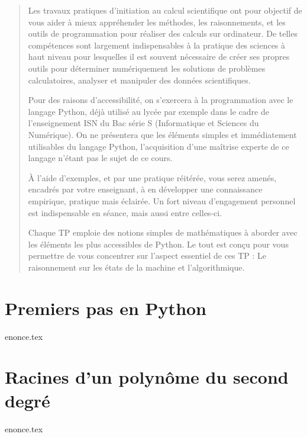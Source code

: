 \documentclass[a4paper,11pt,titlepage]{article}
\begin{document}
\begin{abstract}
  Les travaux  pratiques d'initiation au calcul  scientifique ont pour
  objectif  de  vous  aider  à mieux  appréhender  les  méthodes,  les
  raisonnements,  et les  outils  de programmation  pour réaliser  des
  calculs  sur  ordinateur.   De  telles  compétences  sont  largement
  indispensables  à  la pratique  des  sciences  à haut  niveau pour
  lesquelles il est souvent nécessaire de créer ses propres outils pour
  déterminer  numériquement  les solutions de problèmes calculatoires,
  analyser et manipuler des données scientifiques.

  Pour des  raisons d'accessibilité, on s'exercera  à la programmation
  avec le  langage Python, déjà utilisé  au lycée par exemple  dans le
  cadre de l'enseignement ISN du Bac série S (Informatique et Sciences
  du  Numérique).   On  ne  présentera que  les  éléments  simples  et
  immédiatement  utilisables du  langage  Python, l'acquisition  d'une
  maîtrise experte de ce langage n'étant pas le sujet de ce cours.

  À  l'aide  d'exemples, et  par  une  pratique réitérée,  vous  serez
  amenés,  encadrés   par  votre  enseignant,  à   en  développer  une
  connaissance  empirique, pratique  mais  éclairée.   Un fort  niveau
  d'engagement  personnel est  indispensable en  séance, mais aussi
  entre celles-ci. 

  Chaque TP  emploie des  notions simples  de mathématiques  à aborder
  avec les éléments les plus accessibles  de Python. Le tout est conçu
  pour vous permettre de vous concentrer sur l'aspect essentiel de ces
  TP : Le raisonnement sur les états de la machine et l'algorithmique.
  
\end{abstract}






\pagebreak
\section{Premiers pas en Python}
{enonce.tex}
\pagebreak

\section{Racines d'un polynôme du second degré}
{enonce.tex}
\pagebreak
\end{document}
